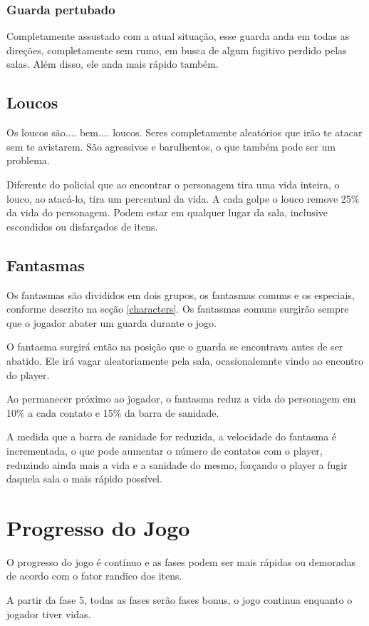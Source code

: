 \subsubsection*{Guarda pertubado}

Completamente assustado com a atual situação, esse guarda anda em todas as direções, completamente sem rumo, em busca de algum fugitivo perdido pelas salas. Além disso, ele anda mais rápido também.

\subsection{Loucos}

Os loucos são.... bem.... loucos. Seres completamente aleatórios que irão te atacar sem te avistarem. São agressivos e barulhentos, o que também pode ser um problema. 

Diferente do policial que ao encontrar o personagem tira uma vida inteira, o louco, ao atacá-lo, tira um percentual da vida. A cada golpe o louco remove 25\% da vida do personagem. Podem estar em qualquer lugar da sala, inclusive escondidos ou disfarçados de itens.

\subsection{Fantasmas}
Os fantasmas são divididos em dois grupos, os fantasmas comuns e os especiais, conforme descrito na seção \ref{characters}. Os fantasmas comuns surgirão sempre que o jogador abater um guarda durante o jogo. 

O fantasma surgirá então na posição que o guarda se encontrava antes de ser abatido. Ele irá vagar aleatoriamente pela sala, ocasionalemnte vindo ao encontro do player. 

Ao permanecer próximo ao jogador, o fantasma reduz a vida do personagem em 10\% a cada contato e 15\% da barra de sanidade.

A medida que a barra de sanidade for reduzida, a velocidade do fantasma é incrementada, o que pode aumentar o número de contatos com o player, reduzindo ainda mais a vida e a sanidade do mesmo, forçando o player a fugir daquela sala o mais rápido possível.

\section{Progresso do Jogo}
O progresso do jogo é contínuo e as fases podem ser mais rápidas ou demoradas de acordo com o fator randico dos itens.

A partir da fase 5, todas as fases serão fases bonus, o jogo continua enquanto o jogador tiver vidas.